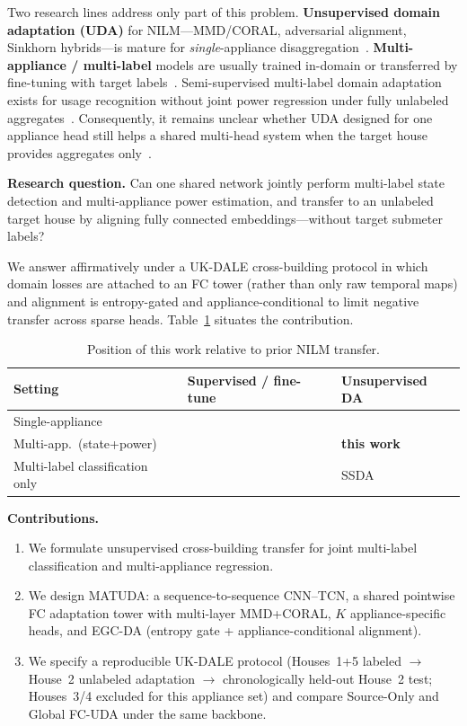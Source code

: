 \documentclass[journal]{IEEEtran}
\begin{document}
Two research lines address only part of this problem.
\textbf{Unsupervised domain adaptation (UDA)} for NILM---MMD/CORAL, adversarial alignment, Sinkhorn hybrids---is mature for \emph{single}-appliance disaggregation~\cite{liu2022uda,lin2022dda,xiong2026ahda,lu2026edge}.
\textbf{Multi-appliance / multi-label} models are usually trained in-domain or transferred by fine-tuning with target labels~\cite{li2023multiobjective,sun2025transfer}.
Semi-supervised multi-label domain adaptation exists for usage recognition without joint power regression under fully unlabeled aggregates~\cite{hur2022ssda}.
Consequently, it remains unclear whether UDA designed for one appliance head still helps a shared multi-head system when the target house provides aggregates only~\cite{muaz2024when}.

\textbf{Research question.}
Can one shared network jointly perform multi-label state detection and multi-appliance power estimation, and transfer to an unlabeled target house by aligning fully connected embeddings---without target submeter labels?

We answer affirmatively under a UK-DALE cross-building protocol in which domain losses are attached to an FC tower (rather than only raw temporal maps) and alignment is entropy-gated and appliance-conditional to limit negative transfer across sparse heads.
Table~\ref{tab:gap} situates the contribution.

\begin{table}[!t]
\caption{Position of this work relative to prior NILM transfer.}
\label{tab:gap}
\centering
\scriptsize
\begin{tabular}{@{}lll@{}}
\toprule
Setting & Supervised / fine-tune & Unsupervised DA \\
\midrule
Single-appliance & \cite{dincecco2020transfer} & \cite{liu2022uda,lin2022dda,lu2026edge} \\
Multi-app.\ (state+power) & \cite{sun2025transfer,li2023multiobjective} & \textbf{this work} \\
Multi-label classification only & \cite{tanoni2023weak} & SSDA~\cite{hur2022ssda} \\
\bottomrule
\end{tabular}
\end{table}

\textbf{Contributions.}
\begin{enumerate}
\item We formulate unsupervised cross-building transfer for joint multi-label classification and multi-appliance regression.
\item We design MATUDA: a sequence-to-sequence CNN--TCN, a shared pointwise FC adaptation tower with multi-layer MMD+CORAL, $K$ appliance-specific heads, and EGC-DA (entropy gate + appliance-conditional alignment).
\item We specify a reproducible UK-DALE protocol (Houses~1+5 labeled $\rightarrow$ House~2 unlabeled adaptation $\rightarrow$ chronologically held-out House~2 test; Houses~3/4 excluded for this appliance set) and compare Source-Only and Global FC-UDA under the same backbone.
\end{enumerate}
\end{document}

